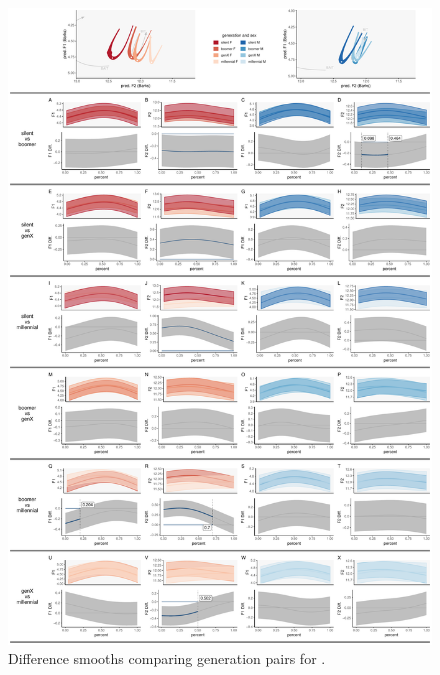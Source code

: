 \begin{figure}[p]
    \centering
    \includegraphics[width=\textwidth]{Figures/BIT/BIT_detailed_generation_panel_plot.pdf}
    \caption{Difference smooths comparing generation pairs for \bit.}
    \label{fig:bit_diff_smooths_gen}
\end{figure}

